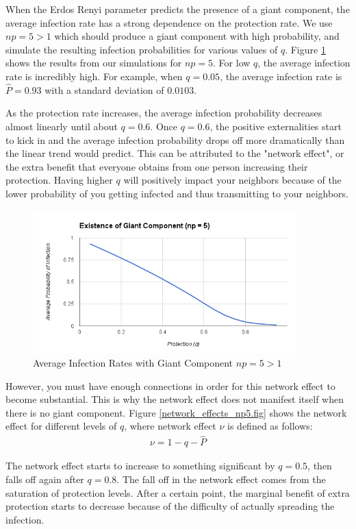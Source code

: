 \documentclass{article}
\theoremstyle{plain}
\begin{document}
When the Erdos Renyi parameter predicts the presence of a giant component, the average infection rate has a strong dependence on the protection rate. We use $np = 5 > 1$ which should produce a giant component with high probability, and simulate the resulting infection probabilities for various values of $q$. Figure \ref{avg_prob_np5.fig} shows the results from our simulations for $np = 5$. For low $q$, the average infection rate is incredibly high. For example, when $q = 0.05$, the average infection rate is $\hat{P} = 0.93$ with a standard deviation of $0.0103$.

As the protection rate increases, the average infection probability decreases almost linearly until about $q = 0.6$. Once $q = 0.6$, the positive externalities start to kick in and the average infection probability drops off more dramatically than the linear trend would predict. This can be attributed to the "network effect", or the extra benefit that everyone obtains from one person increasing their protection. Having higher $q$ will positively impact your neighbors because of the lower probability of you getting infected and thus transmitting to your neighbors. 

\begin{figure}[h!]
  \centering
  \includegraphics[width=4in]{avg_prob_np5.png}
  \caption{Average Infection Rates with Giant Component $np = 5 > 1$}
  \label{avg_prob_np5.fig}
\end{figure}

However, you must have enough connections in order for this network effect to become substantial. This is why the network effect does not manifest itself when there is no giant component. Figure \ref{network_effects_np5.fig} shows the network effect for different levels of $q$, where network effect $\nu$ is defined as follows:
\begin{eqnarray}
 \nu = 1 - q - \hat{P}
\end{eqnarray}

The network effect starts to increase to something significant by $q = 0.5$, then falls off again after $q = 0.8$. The fall off in the network effect comes from the saturation of protection levels. After a certain point, the marginal benefit of extra protection starts to decrease because of the difficulty of actually spreading the infection.
\end{document}
